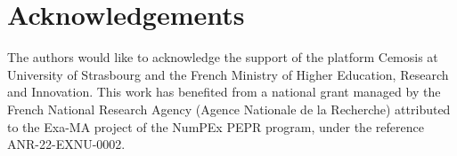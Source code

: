 \documentclass[a4paper]{article}
\begin{document}
\appendix




\section*{Acknowledgements}

The authors would like to acknowledge the support of the platform Cemosis at University of Strasbourg and the French Ministry of Higher Education, Research and Innovation.
This work has benefited from a national grant managed by the French National Research Agency (Agence Nationale de la Recherche) attributed to the Exa-MA project of the NumPEx PEPR program, under the reference ANR-22-EXNU-0002.


\printbibliography{}
\end{document}
